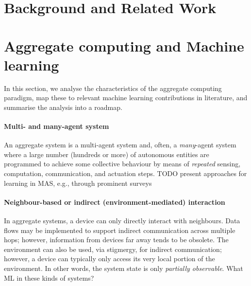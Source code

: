 \documentclass[
twocolumn,
]{ceurart}
\newcommand{\meta}[1]{{\color{blue}#1}}
\begin{document}

\section{Background and Related Work}

\section{Aggregate computing and Machine learning}

In this section,
 we analyse the characteristics of the aggregate computing paradigm,
 map these to relevant machine learning contributions in literature,
 and summarise the analysis into a roadmap.

\paragraph{Multi- and many-agent system}
%
An aggregate system is a multi-agent system
 and, often, a \emph{many}-agent system
 where a large number (hundreds or more)
 of autonomous entities are programmed to achieve 
 some collective behaviour by means of \emph{repeated} 
 sensing, computation, communication, and actuation steps.
%
\meta{TODO present approaches for learning in MAS, e.g., through prominent surveys}

\paragraph{Neighbour-based or indirect (environment-mediated) interaction}
%
In aggregate systems,
 a device can only directly interact with neighbours.
%
Data flows may be implemented
 to support indirect communication across multiple hops;
 however, information from devices far away tends to be obsolete.
%
The environment can also be used, via stigmergy,
 for indirect communication;
 however, a device can typically only access 
  its very local portion of the environment.
%
In other words, the system state is only \emph{partially observable}.
%
\meta{What ML in these kinds of systems?}
\end{document}
